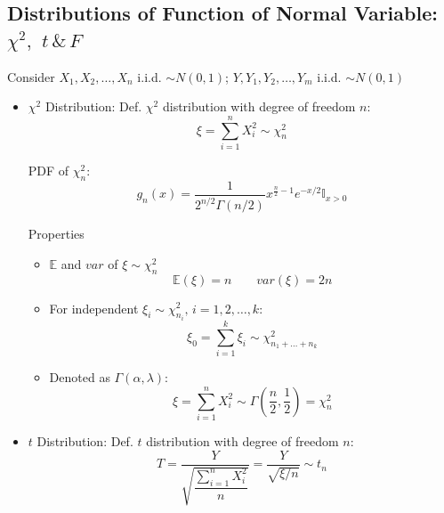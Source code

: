     \subsection{Distributions of Function of Normal Variable: $\chi^2,$ $t\,\& \,F$}\label{chi2_t_F_properties}
        Consider $X_1,X_2,\ldots,X_n$ i.i.d. $\sim N(0,1)$; $Y,Y_1,Y_2,\ldots,Y_m$ i.i.d. $\sim N(0,1)$
        \begin{itemize}
            \item $\chi^2$ Distribution: Def. $\chi^2$ distribution with degree of freedom $n$:
            \begin{equation}        
                \xi =\sum_{i=1}^n X_i^2\sim \chi^2_n
            \end{equation}

            PDF of $\chi^2_n$:
            \begin{equation}        
                g_n(x)=\dfrac{1}{2^{n/2}\Gamma(n/2)}x^{\frac{n}{2}-1}e^{-x/2}\mathbb{I}_{x>0}  
            \end{equation}

            Properties
            \begin{itemize}
                \item $\mathbb{E}$ and $var$ of $\xi\sim\chi^2_n$
                \begin{equation}            \mathbb{E}(\xi)=n\qquad var(\xi)=2n\end{equation}
                \item For independent $\xi_i\sim\chi^2_{n_i},\, i=1,2,\ldots,k$:\begin{equation}            
                    \xi_0=\sum_{i=1}^k\xi_i\sim\chi^2_{n_1+\ldots+n_k}\end{equation}
                \item Denoted as $\Gamma(\alpha,\lambda)$: \begin{equation}            \xi=\sum_{i=1}^nX_i^2\sim\Gamma(\frac{n}{2},\frac{1}{2})=\chi^2_n\end{equation}
            \end{itemize}
            \item $t$ Distribution: Def. $t$ distribution with degree of freedom $n$:
            \begin{equation}        
                T=\frac{Y}{\sqrt{\dfrac{\sum_{i=1}^nX_i^2}{n}}}=\frac{Y}{\sqrt{\xi \big/ n}}\sim t_n
            \end{equation}


\end{itemize}
